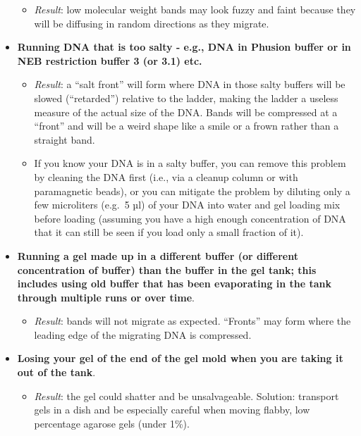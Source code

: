 \documentclass[
  letterpaper,
  DIV=11,
  numbers=noendperiod]{scrreprt}
\providecommand{\tightlist}{%
  \setlength{\itemsep}{0pt}\setlength{\parskip}{0pt}}\usepackage{longtable,booktabs,array}
\begin{document}
\begin{itemize}
  \begin{itemize}
  \tightlist
  \item
    \emph{Result}: low molecular weight bands may look fuzzy and faint
    because they will be diffusing in random directions as they migrate.
  \end{itemize}
\item
  \textbf{Running DNA that is too salty - e.g., DNA in Phusion buffer or
  in NEB restriction buffer 3 (or 3.1) etc.}

  \begin{itemize}
  \item
    \emph{Result}: a ``salt front'' will form where DNA in those salty
    buffers will be slowed (``retarded'') relative to the ladder, making
    the ladder a useless measure of the actual size of the DNA. Bands
    will be compressed at a ``front'' and will be a weird shape like a
    smile or a frown rather than a straight band.
  \item
    If you know your DNA is in a salty buffer, you can remove this
    problem by cleaning the DNA first (i.e., via a cleanup column or
    with paramagnetic beads), or you can mitigate the problem by
    diluting only a few microliters (e.g.~5 µl) of your DNA into water
    and gel loading mix before loading (assuming you have a high enough
    concentration of DNA that it can still be seen if you load only a
    small fraction of it).
  \end{itemize}
\item
  \textbf{Running a gel made up in a different buffer (or different
  concentration of buffer) than the buffer in the gel tank; this
  includes using old buffer that has been evaporating in the tank
  through multiple runs or over time}.

  \begin{itemize}
  \tightlist
  \item
    \emph{Result}: bands will not migrate as expected. ``Fronts'' may
    form where the leading edge of the migrating DNA is compressed.
  \end{itemize}
\item
  \textbf{Losing your gel of the end of the gel mold when you are taking
  it out of the tank}.

  \begin{itemize}
  \tightlist
  \item
    \emph{Result}: the gel could shatter and be unsalvageable. Solution:
    transport gels in a dish and be especially careful when moving
    flabby, low percentage agarose gels (under 1\%).
  \end{itemize}
\end{itemize}
\end{document}
